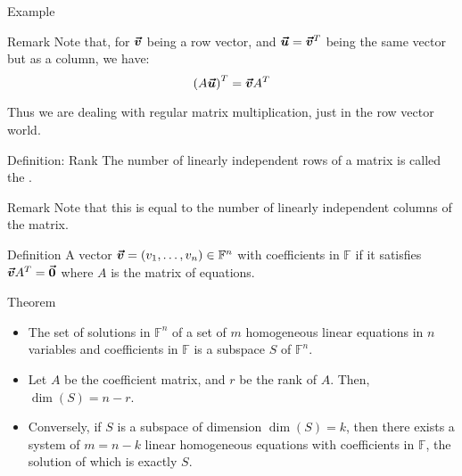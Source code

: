 \documentclass[a4paper]{article}
\begin{document}
\begin{parag}{Example}
    \begin{subparag}{Remark}
        Note that, for $\bm{\protect\vec{v}}$ being a row vector, and $\bm{\protect\vec{u}} = \bm{\protect\vec{v}}^T$ being the same vector but as a column, we have: 
        \[\left(A \bvec{u}\right)^T = \bvec{v} A^T\]

        Thus we are dealing with regular matrix multiplication, just in the row vector world.
    \end{subparag}
\end{parag}

\begin{parag}{Definition: Rank}
    The number of linearly independent rows of a matrix is called the . 

    \begin{subparag}{Remark}
        Note that this is equal to the number of linearly independent columns of the matrix.
    \end{subparag}
\end{parag}

\begin{parag}{Definition}
    A vector $\bvec{v} = \left(v_1, \ldots, v_n\right) \in \mathbb{F}^n$  with coefficients in $\mathbb{F}$ if it satisfies $\bm{\protect\vec{v}} A^T = \bm{\protect\vec{0}}$ where $A$ is the matrix of equations.
\end{parag}

\begin{parag}{Theorem}
    \begin{itemize}[left=0pt]
        \item The set of solutions in $\mathbb{F}^n$ of a set of $m$ homogeneous linear equations in $n$ variables and coefficients in $\mathbb{F}$ is a subspace $S$ of $\mathbb{F}^n$.
        \item Let $A$ be the coefficient matrix, and $r$ be the rank of $A$. Then, $\dim\left(S\right) = n - r$.
        \item Conversely, if $S$ is a subspace of dimension $\dim\left(S\right) = k$, then there exists a system of $m = n - k$ linear homogeneous equations with coefficients in $\mathbb{F}$, the solution of which is exactly $S$.
    \end{itemize}
\end{parag}
\end{document}
